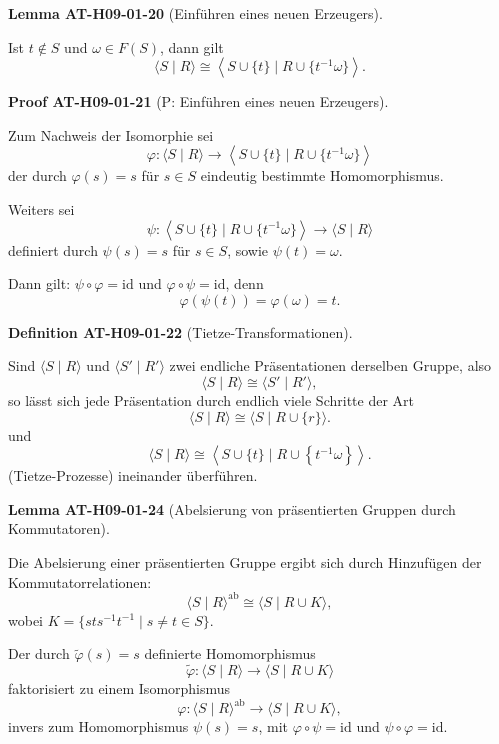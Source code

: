 \documentclass[10pt, letterpaper]{article}
\newcommand{\CustomHeading}[3]{%
  \par\medskip\noindent%
  \textbf{#1 #2} \textnormal{(#3)}.\enskip%
}
\newenvironment{DEF}[2]{\CustomHeading{Definition}{#1}{#2}}{}
\newenvironment{LEM}[2]{\CustomHeading{Lemma}{#1}{#2}}{}
\newenvironment{PROOF}[2]{\CustomHeading{Proof}{#1}{#2}}{}
\begin{document}
\begin{LEM}{AT-H09-01-20}{Einführen eines neuen Erzeugers}
Ist $t \notin S$ und $\omega \in F(S)$, dann gilt
\[
\langle S \mid R\rangle \cong \left\langle S \cup \{t\} \mid R \cup \{t^{-1} \omega\} \right\rangle.
\]
\end{LEM}

\begin{PROOF}{AT-H09-01-21}{P: Einführen eines neuen Erzeugers}
Zum Nachweis der Isomorphie sei
\[
\varphi: \langle S \mid R\rangle \to \left\langle S \cup \{t\} \mid R \cup \{t^{-1}\omega\} \right\rangle
\]
der durch $\varphi(s) = s$ für $s \in S$ eindeutig bestimmte Homomorphismus.

Weiters sei
\[
\psi: \left\langle S \cup \{t\} \mid R \cup \{t^{-1}\omega\} \right\rangle \to \langle S \mid R\rangle
\]
definiert durch $\psi(s) = s$ für $s \in S$, sowie $\psi(t) = \omega$.

Dann gilt: $\psi \circ \varphi = \mathrm{id}$ und $\varphi \circ \psi = \mathrm{id}$, denn
\[
\varphi(\psi(t)) = \varphi(\omega) = t.
\]
\end{PROOF}

\begin{DEF}{AT-H09-01-22}{Tietze-Transformationen}
Sind $\langle S \mid R\rangle$ und $\langle S' \mid R'\rangle$ zwei endliche Präsentationen derselben Gruppe, also
\[
\langle S \mid R\rangle \cong \langle S' \mid R'\rangle,
\]
so lässt sich jede Präsentation durch endlich viele Schritte der Art
$$
\langle S \mid R\rangle \cong\langle S \mid R \cup\{r\}\rangle .
$$
und
$$
\langle S \mid R\rangle \cong\left\langle S \cup\{t\} \mid R \cup\left\{t^{-1} \omega\right\}\right\rangle .
$$
(Tietze-Prozesse) ineinander überführen.
\end{DEF}

\begin{LEM}{AT-H09-01-24}{Abelsierung von präsentierten Gruppen durch Kommutatoren}
Die Abelsierung einer präsentierten Gruppe ergibt sich durch Hinzufügen der Kommutatorrelationen:
\[
\langle S \mid R\rangle^{\mathrm{ab}} \cong \langle S \mid R \cup K\rangle,
\]
wobei $K = \{ sts^{-1}t^{-1} \mid s \neq t \in S \}$.

Der durch $\tilde{\varphi}(s) = s$ definierte Homomorphismus
\[
\tilde{\varphi}: \langle S \mid R\rangle \to \langle S \mid R \cup K\rangle
\]
faktorisiert zu einem Isomorphismus
\[
\varphi: \langle S \mid R\rangle^{\mathrm{ab}} \to \langle S \mid R \cup K\rangle,
\]
invers zum Homomorphismus $\psi(s) = s$, mit $\varphi \circ \psi = \mathrm{id}$ und $\psi \circ \varphi = \mathrm{id}$.
\end{LEM}
\end{document}
